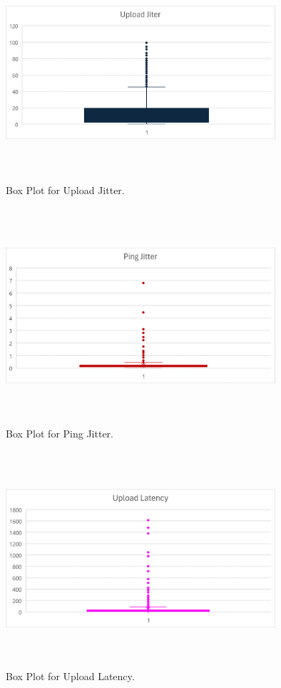 \documentclass[conference]{IEEEtran}
\begin{document}
\begin{figure}[htbp]
    \centerline{\includegraphics[width=10cm,height=8cm,keepaspectratio]{Figures/Picture4.png}}
    \caption{Box Plot for Upload Jitter.}
    \label{fig4}
\end{figure}

\begin{figure}[htbp]
    \centerline{\includegraphics[width=10cm,height=8cm,keepaspectratio]{Figures/Picture5.png}}
    \caption{Box Plot for Ping Jitter.}
    \label{fig5}
\end{figure}

\begin{figure}[htbp]
    \centerline{\includegraphics[width=10cm,height=8cm,keepaspectratio]{Figures/Picture6.png}}
    \caption{Box Plot for Upload Latency.}
    \label{fig6}
\end{figure}
\end{document}
